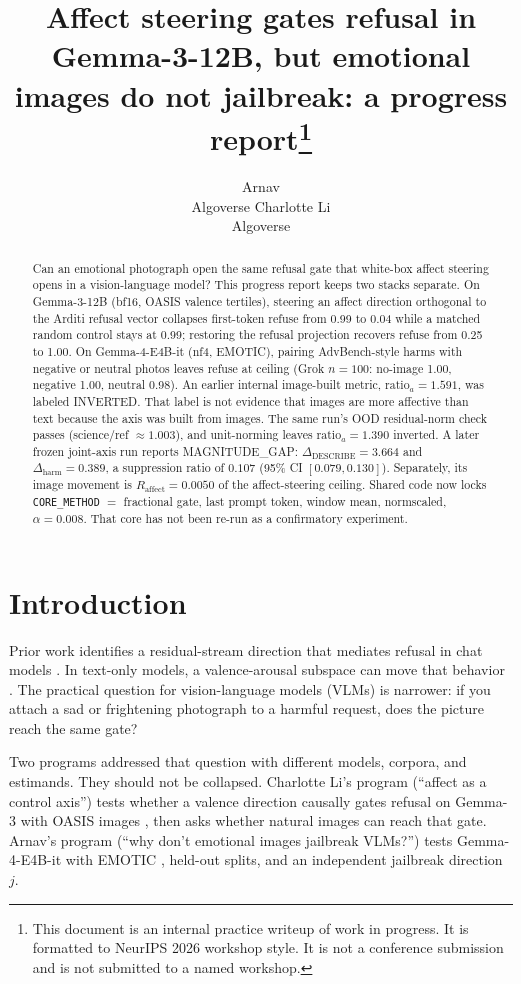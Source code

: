 \documentclass{article}
\title{Affect steering gates refusal in Gemma-3-12B, but emotional images do not jailbreak: a progress report\thanks{This document is an internal practice writeup of work in progress. It is formatted to NeurIPS 2026 workshop style. It is not a conference submission and is not submitted to a named workshop.}}
\author{%
  Arnav \\
  Algoverse
  \And
  Charlotte Li \\
  Algoverse
}
\begin{document}
\maketitle

\begin{abstract}
Can an emotional photograph open the same refusal gate that white-box affect steering opens in a vision-language model? This progress report keeps two stacks separate. On Gemma-3-12B (bf16, OASIS valence tertiles), steering an affect direction orthogonal to the Arditi refusal vector collapses first-token refuse from 0.99 to 0.04 while a matched random control stays at 0.99; restoring the refusal projection recovers refuse from 0.25 to 1.00. On Gemma-4-E4B-it (nf4, EMOTIC), pairing AdvBench-style harms with negative or neutral photos leaves refuse at ceiling (Grok $n=100$: no-image 1.00, negative 1.00, neutral 0.98). An earlier internal image-built metric, $\mathrm{ratio}_a=1.591$, was labeled INVERTED. That label is not evidence that images are more affective than text because the axis was built from images. The same run's OOD residual-norm check passes (science/ref $\approx 1.003$), and unit-norming leaves $\mathrm{ratio}_a=1.390$ inverted. A later frozen joint-axis run reports MAGNITUDE\_GAP: $\Delta_{\mathrm{DESCRIBE}}=3.664$ and $\Delta_{\mathrm{harm}}=0.389$, a suppression ratio of $0.107$ (95\% CI $[0.079,0.130]$). Separately, its image movement is $R_{\mathrm{affect}}=0.0050$ of the affect-steering ceiling. Shared code now locks \texttt{CORE\_METHOD} $=$ fractional gate, last prompt token, window mean, normscaled, $\alpha=0.008$. That core has not been re-run as a confirmatory experiment.
\end{abstract}

\section{Introduction}
\label{sec:intro}

Prior work identifies a residual-stream direction that mediates refusal in chat models \citep{arditi2024refusal}. In text-only models, a valence-arousal subspace can move that behavior \citep{sun2026valence}. The practical question for vision-language models (VLMs) is narrower: if you attach a sad or frightening photograph to a harmful request, does the picture reach the same gate?

Two programs addressed that question with different models, corpora, and estimands. They should not be collapsed. Charlotte Li's program (``affect as a control axis'') tests whether a valence direction causally gates refusal on Gemma-3 \citep{gemmateam2025gemma3} with OASIS images \citep{kurdi2017oasis}, then asks whether natural images can reach that gate. Arnav's program (``why don't emotional images jailbreak VLMs?'') tests Gemma-4-E4B-it \citep{gemmateam2026gemma4} with EMOTIC \citep{kosti2017emotion,kosti2019emotic}, held-out splits, and an independent jailbreak direction $j$.
\end{document}
